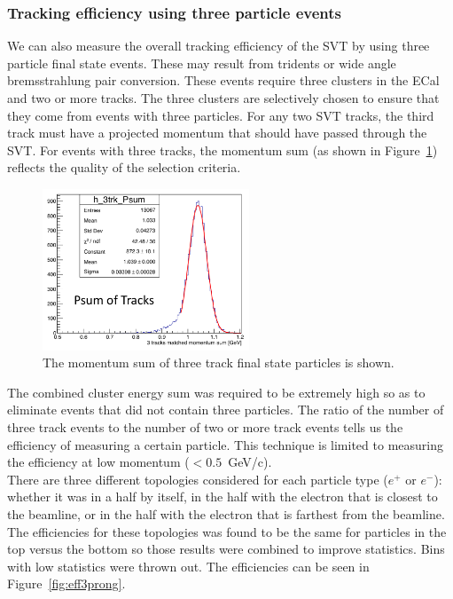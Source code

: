 \subsubsection{Tracking efficiency using three particle events}
We can also measure the overall tracking efficiency of the SVT by using three particle final state events. These may result from tridents or wide angle bremsstrahlung pair conversion. These events require three clusters in the ECal and two or more tracks. The three clusters are selectively chosen to ensure that they come from events with three particles. For any two SVT tracks, the third track must have a projected momentum that should have passed through the SVT. For events with three tracks, the momentum sum (as shown in Figure~\ref{Figure:psumtrks}) reflects the quality of the selection criteria. 
\begin{figure}[thb]
  \centering
      \includegraphics[width=0.55\textwidth]{pics/performance/pSum_3trk.png}
  \caption[Momentum sum of three track final state particles]{The momentum sum of three track final state particles is shown.}
  \label{Figure:psumtrks}
\end{figure}

The combined cluster energy sum was required to be extremely high so as to eliminate events that did not contain three particles. The ratio of the number of three track events to the number of two or more track events tells us the efficiency of measuring a certain particle. This technique is limited to measuring the efficiency at low momentum ($<0.5$~GeV/c).\\
\indent There are three different topologies considered for each particle type ($e^+$ or $e^-$): whether it was in a half by itself, in the half with the electron that is closest to the beamline, or in the half with the electron that is farthest from the beamline. The efficiencies for these topologies was found to be the same for particles in the top versus the bottom so those results were combined to improve statistics. Bins with low statistics were thrown out. The efficiencies can be seen in Figure~\ref{fig:eff3prong}.


